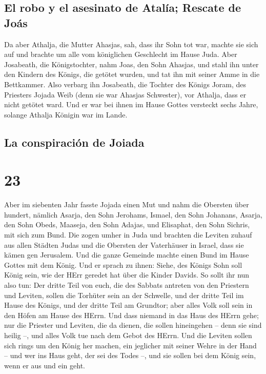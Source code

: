\hypertarget{el-robo-y-el-asesinato-de-ataluxeda-rescate-de-jouxe1s}{%
\subsection{El robo y el asesinato de Atalía; Rescate de
Joás}\label{el-robo-y-el-asesinato-de-ataluxeda-rescate-de-jouxe1s}}

 Da aber Athalja, die Mutter Ahasjas, sah, dass ihr Sohn
tot war, machte sie sich auf und brachte um alle vom königlichen
Geschlecht im Hause Juda.  Aber Josabeath, die
Königstochter, nahm Joas, den Sohn Ahasjas, und stahl ihn unter den
Kindern des Königs, die getötet wurden, und tat ihn mit seiner Amme in
die Bettkammer. Also verbarg ihn Josabeath, die Tochter des Königs
Joram, des Priesters Jojada Weib (denn sie war Ahasjas Schwester), vor
Athalja, dass er nicht getötet ward.  Und er war bei
ihnen im Hause Gottes versteckt sechs Jahre, solange Athalja Königin war
im Lande.

\hypertarget{la-conspiraciuxf3n-de-joiada}{%
\subsection{La conspiración de
Joiada}\label{la-conspiraciuxf3n-de-joiada}}

\hypertarget{section-22}{%
\section{23}\label{section-22}}

 Aber im siebenten Jahr fasste Jojada einen Mut und nahm
die Obersten über hundert, nämlich Asarja, den Sohn Jerohams, Ismael,
den Sohn Johanans, Asarja, den Sohn Obeds, Maaseja, den Sohn Adajas, und
Elisaphat, den Sohn Sichris, mit sich zum Bund.  Die zogen
umher in Juda und brachten die Leviten zuhauf aus allen Städten Judas
und die Obersten der Vaterhäuser in Israel, dass sie kämen gen
Jerusalem.  Und die ganze Gemeinde machte einen Bund im
Hause Gottes mit dem König. Und er sprach zu ihnen: Siehe, des Königs
Sohn soll König sein, wie der HErr geredet hat über die Kinder Davids.
 So sollt ihr nun also tun: Der dritte Teil von euch, die
des Sabbats antreten von den Priestern und Leviten, sollen die Torhüter
sein an der Schwelle,  und der dritte Teil im Hause des
Königs, und der dritte Teil am Grundtor; aber alles Volk soll sein in
den Höfen am Hause des HErrn.  Und dass niemand in das
Haus des HErrn gehe; nur die Priester und Leviten, die da dienen, die
sollen hineingehen -- denn sie sind heilig --, und alles Volk tue nach
dem Gebot des HErrn.  Und die Leviten sollen sich rings um
den König her machen, ein jeglicher mit seiner Wehre in der Hand -- und
wer ins Haus geht, der sei des Todes --, und sie sollen bei dem König
sein, wenn er aus und ein geht.

